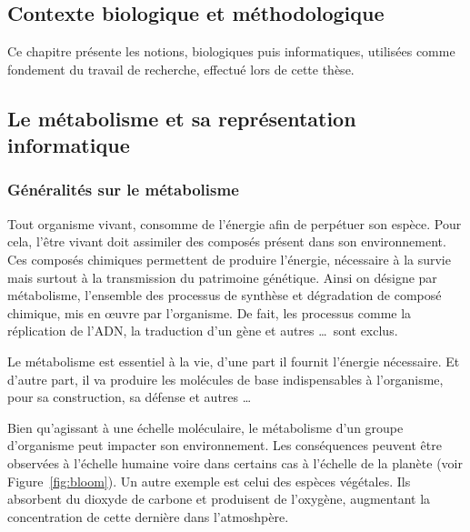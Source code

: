 \begin{refsection}
	\chapter{Contexte biologique et méthodologique}

    Ce chapitre présente les notions, biologiques puis informatiques, utilisées comme fondement du travail de recherche, effectué lors de cette thèse.
    
    
    \section{Le métabolisme et sa représentation informatique}
    \subsection{Généralités sur le métabolisme}
    
    Tout organisme vivant, consomme de l'énergie afin de perpétuer son espèce. Pour cela, l'être vivant doit assimiler des composés présent dans son environnement. Ces composés chimiques permettent de produire l'énergie, nécessaire à la survie mais surtout à la transmission du patrimoine génétique. Ainsi on désigne par métabolisme, l'ensemble des processus de synthèse et dégradation de composé chimique, mis en œuvre par l'organisme. De fait, les processus comme la réplication de l'\gls{ADN}, la traduction d'un gène et autres \ldots~sont exclus.
    
    Le métabolisme est essentiel à la vie, d'une part il fournit l'énergie nécessaire. Et d'autre part, il va produire les molécules de base indispensables à l'organisme, pour sa construction, sa défense et autres \ldots 
    
    Bien qu'agissant à une échelle moléculaire, le métabolisme d'un groupe d'organisme peut impacter son environnement. Les conséquences peuvent être observées à l'échelle humaine voire dans certains cas à l'échelle de la planète (voir Figure~\ref{fig:bloom}). Un autre exemple est celui des espèces végétales. Ils absorbent du dioxyde de carbone et produisent de l'oxygène, augmentant la concentration de cette dernière dans l'atmoshpère.
    

\end{refsection}

